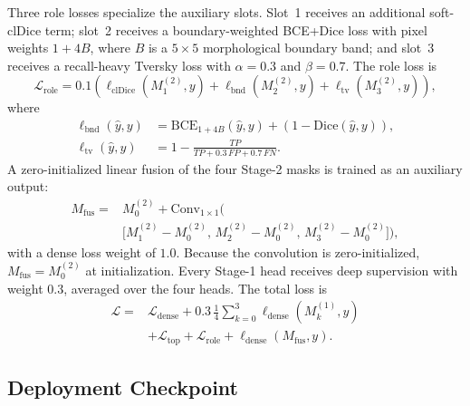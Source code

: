 Three role losses specialize the auxiliary slots. Slot~1 receives an
additional soft-clDice term; slot~2 receives a boundary-weighted BCE+Dice
loss with pixel weights $1+4B$, where $B$ is a $5\times5$ morphological
boundary band; and slot~3 receives a recall-heavy Tversky loss with
$\alpha=0.3$ and $\beta=0.7$. The role loss is
\begin{equation}
\mathcal{L}_{\mathrm{role}}
=0.1\!\left(\ell_{\mathrm{clDice}}(M_1^{(2)},y)
+\ell_{\mathrm{bnd}}(M_2^{(2)},y)
+\ell_{\mathrm{tv}}(M_3^{(2)},y)\right),
\label{eq:supp_role}
\end{equation}
where
\begin{equation}
\begin{aligned}
\ell_{\mathrm{bnd}}(\hat y,y)
&=\mathrm{BCE}_{1+4B}(\hat y,y)+\left(1-\mathrm{Dice}(\hat y,y)\right),\\
\ell_{\mathrm{tv}}(\hat y,y)
&=1-\frac{TP}{TP+0.3\,FP+0.7\,FN}.
\end{aligned}
\label{eq:supp_bnd_tv}
\end{equation}
A zero-initialized linear fusion of the four Stage-2 masks is trained as an
auxiliary output:
\begin{equation}
\begin{aligned}
M_{\mathrm{fus}}={}&M_0^{(2)}+\mathrm{Conv}_{1\times1}\Big(\\
&\big[M_1^{(2)}-M_0^{(2)},\,M_2^{(2)}-M_0^{(2)},\,
M_3^{(2)}-M_0^{(2)}\big]\Big),
\end{aligned}
\label{eq:supp_fusion}
\end{equation}
with a dense loss weight of $1.0$. Because the convolution is zero-initialized,
$M_{\mathrm{fus}}=M_0^{(2)}$ at initialization. Every Stage-1 head receives
deep supervision with weight $0.3$, averaged over the four heads. The total
loss is
\begin{equation}
\begin{aligned}
\mathcal{L}={}&\mathcal{L}_{\mathrm{dense}}
+0.3\,\frac{1}{4}\sum_{k=0}^{3}\ell_{\mathrm{dense}}(M_k^{(1)},y)\\
&+\mathcal{L}_{\mathrm{top}}+\mathcal{L}_{\mathrm{role}}
+\ell_{\mathrm{dense}}(M_{\mathrm{fus}},y).
\end{aligned}
\label{eq:supp_total}
\end{equation}

\subsection{Deployment Checkpoint}
\label{sec:supp_deployment}

